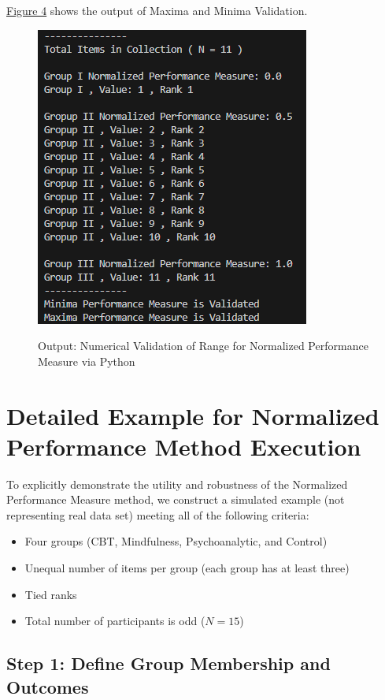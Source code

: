 \documentclass[a4paper,fleqn,review]{cas-sc}
\begin{document}
\hyperref[fig:output-numerical-validation-minima-maxima]{Figure 4} shows the output of Maxima and Minima Validation.
\begin{figure}
	\caption{Output: Numerical Validation of Range for Normalized Performance Measure via Python}
	\centering
	\includegraphics [scale=1]{output-validation-minima-maxima.png}
	\label{fig:output-numerical-validation-minima-maxima}
\end{figure}


\section{Detailed Example for Normalized Performance Method Execution}

To explicitly demonstrate the utility and robustness of the Normalized Performance Measure method, we construct a simulated example (not representing real data set) meeting all of the following criteria:

\begin{itemize}
	\item Four groups (CBT, Mindfulness, Psychoanalytic, and Control)
	\item Unequal number of items per group (each group has at least three)
	\item Tied ranks
	\item Total number of participants is odd ($N = 15$)
\end{itemize}

\vspace{1em}

\subsection*{Step 1: Define Group Membership and Outcomes}
\end{document}
